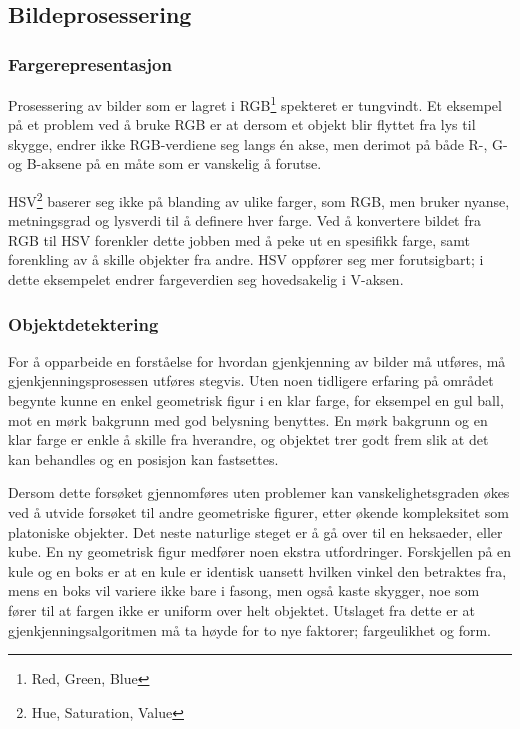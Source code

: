 \subsection{Bildeprosessering}

\subsubsection{Fargerepresentasjon}
Prosessering av bilder som er lagret i RGB\footnote{Red, Green, Blue} spekteret er tungvindt. Et eksempel på et problem ved å bruke RGB er at dersom et objekt blir flyttet fra lys til skygge, endrer ikke RGB-verdiene seg langs én akse, men derimot på både R-, G- og B-aksene på en måte som er vanskelig å forutse.

HSV\footnote{Hue, Saturation, Value} baserer seg ikke på blanding av ulike farger, som RGB, men bruker nyanse, metningsgrad og lysverdi til å definere hver farge. Ved å konvertere bildet fra RGB til HSV forenkler dette jobben med å peke ut en spesifikk farge, samt forenkling av å skille objekter fra andre. HSV oppfører seg mer forutsigbart; i dette eksempelet endrer fargeverdien seg hovedsakelig i V-aksen. 

\subsubsection{Objektdetektering}
For å opparbeide en forståelse for hvordan gjenkjenning av bilder må utføres, må gjenkjenningsprosessen utføres stegvis. Uten noen tidligere erfaring på området begynte kunne en enkel geometrisk figur i en klar farge, for eksempel en gul ball, mot en mørk bakgrunn med god belysning benyttes. En mørk bakgrunn og en klar farge er enkle å skille fra hverandre, og objektet trer godt frem slik at det kan behandles og en posisjon kan fastsettes.

Dersom dette forsøket gjennomføres uten problemer kan vanskelighetsgraden økes ved å utvide forsøket til andre geometriske figurer, etter økende kompleksitet som platoniske objekter. Det neste naturlige steget er å gå over til en heksaeder, eller kube. En ny geometrisk figur medfører noen ekstra utfordringer. Forskjellen på en kule og en boks er at en kule er identisk uansett hvilken vinkel den betraktes fra, mens en boks vil variere ikke bare i fasong, men også kaste skygger, noe som fører til at fargen ikke er uniform over helt objektet. Utslaget fra dette er at gjenkjenningsalgoritmen må ta høyde for to nye faktorer; fargeulikhet og form. 

